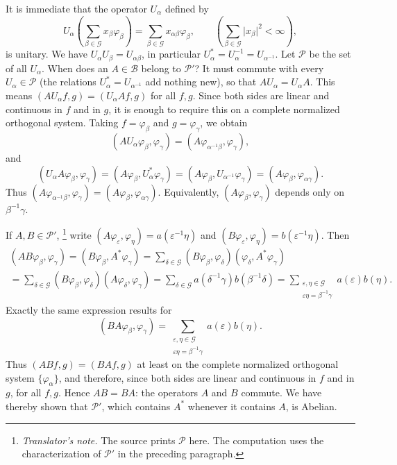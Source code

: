 \documentclass[
  paper=b5,
  twoside=true,
  fontsize=13pt,
  headings=normal,
  bookmarkpackage=false
]{scrartcl}
\theoremstyle{definition}
\newcounter{translatornote}
\newcounter{savedfootnote}
\newcommand{\TranslatorNote}[1]{%
  \stepcounter{translatornote}%
  \setcounter{savedfootnote}{\value{footnote}}%
  \begingroup
    \renewcommand{\thefootnote}{T\arabic{translatornote}}%
    \footnote{\textit{Translator's note.} #1}%
  \endgroup
  \setcounter{footnote}{\value{savedfootnote}}}
\begin{document}
It is immediate that the operator \(U_{\alpha}\) defined by
\[
  U_{\alpha}
  \left(\sum_{\beta\in \mathcal G}x_{\beta}\varphi_{\beta}\right)
  =
  \sum_{\beta\in \mathcal G}x_{\alpha\beta}\varphi_{\beta},
  \qquad
  \left(\sum_{\beta\in \mathcal G}\lvert x_{\beta}\rvert^{2}<\infty\right),
\]
is unitary. We have \(U_{\alpha}U_{\beta}=U_{\alpha\beta}\), in
particular \(U_{\alpha}^{*}=U_{\alpha}^{-1}=U_{\alpha^{-1}}\).
Let \(\mathcal P\) be the set of all \(U_{\alpha}\).  When does an
\(A\in\mathcal B\) belong to \(\mathcal P'\)?  It must commute with every
\(U_{\alpha}\in\mathcal P\) (the relations
\(U_{\alpha}^{*}=U_{\alpha^{-1}}\) add nothing new), so that \(AU_{\alpha}=U_{\alpha}A\). This means
\((AU_{\alpha}f,g)=(U_{\alpha}Af,g)\) for all \(f,g\).  Since both sides are linear and continuous in \(f\) and
in \(g\), it is enough to require this on a complete normalized
orthogonal system.  Taking \(f=\varphi_{\beta}\) and
\(g=\varphi_{\gamma}\), we obtain
\[
  (AU_{\alpha}\varphi_{\beta},\varphi_{\gamma})
  =
  (A\varphi_{\alpha^{-1}\beta},\varphi_{\gamma}),
\]
and
\[
  (U_{\alpha}A\varphi_{\beta},\varphi_{\gamma})
  =
  (A\varphi_{\beta},U_{\alpha}^{*}\varphi_{\gamma})
  =
  (A\varphi_{\beta},U_{\alpha^{-1}}\varphi_{\gamma})
  =
  (A\varphi_{\beta},\varphi_{\alpha\gamma}).
\]
Thus \((A\varphi_{\alpha^{-1}\beta},\varphi_{\gamma})
=(A\varphi_{\beta},\varphi_{\alpha\gamma})\). Equivalently, \((A\varphi_{\beta},\varphi_{\gamma})\) depends only on
\(\beta^{-1}\gamma\).

If \(A,B\in\mathcal P'\),\TranslatorNote{The source prints \(\mathcal P\)
here. The computation uses the characterization of \(\mathcal P'\)
in the preceding paragraph.} write
\((A\varphi_{\varepsilon},\varphi_{\eta})=a(\varepsilon^{-1}\eta)\) and
\((B\varphi_{\varepsilon},\varphi_{\eta})=b(\varepsilon^{-1}\eta)\). Then
\begin{multline*}
  (AB\varphi_{\beta},\varphi_{\gamma})
  =
  (B\varphi_{\beta},A^{*}\varphi_{\gamma})
  =
  \sum_{\delta\in \mathcal G}
  (B\varphi_{\beta},\varphi_{\delta})
  (\varphi_{\delta},A^{*}\varphi_{\gamma})\\
  {}=
  \sum_{\delta\in \mathcal G}
  (B\varphi_{\beta},\varphi_{\delta})
  (A\varphi_{\delta},\varphi_{\gamma})
  =
  \sum_{\delta\in \mathcal G}
  a(\delta^{-1}\gamma)b(\beta^{-1}\delta)
  =
  \sum_{\substack{\varepsilon,\eta\in \mathcal G\\
                   \varepsilon\eta=\beta^{-1}\gamma}}
  a(\varepsilon)b(\eta).
\end{multline*}
Exactly the same expression results for
\[
  (BA\varphi_{\beta},\varphi_{\gamma})
  =
  \sum_{\substack{\varepsilon,\eta\in \mathcal G\\
                   \varepsilon\eta=\beta^{-1}\gamma}}
  a(\varepsilon)b(\eta).
\]
Thus \((ABf,g)=(BAf,g)\) at least on the complete normalized orthogonal
system \(\{\varphi_{\alpha}\}\), and therefore, since both sides are
linear and continuous in \(f\) and in \(g\), for all \(f,g\).  Hence
\(AB=BA\): the operators \(A\) and \(B\) commute.  We have thereby shown
that \(\mathcal P'\), which contains \(A^{*}\) whenever it contains
\(A\), is Abelian.
\end{document}
